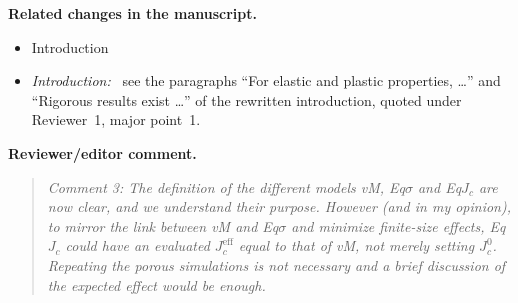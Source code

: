 \documentclass[pdflatex,sn-mathphys-num]{sn-jnl}
\newenvironment{reviewercomment}
  {\par\noindent\textbf{Reviewer/editor comment.}\begin{quote}\itshape}
  {\end{quote}}
\newenvironment{relatedchanges}
  {\par\noindent\textbf{Related changes in the manuscript.}\begin{itemize}\small}
  {\end{itemize}}
\newcommand{\msloc}[1]{\textit{#1:}\ }
\newcommand{\relhead}[1]{\item[]\vspace*{0.2\baselineskip}#1}
\begin{document}
\begin{relatedchanges}
\relhead{Introduction}
\item \msloc{Introduction} see the paragraphs ``For elastic and plastic properties, \dots'' and ``Rigorous results exist \dots'' of the rewritten introduction, quoted under Reviewer~1, major point~1.
\end{relatedchanges}

\begin{reviewercomment}
Comment 3: The definition of the different models vM, Eq$\sigma$ and Eq$J_c$ are now clear, and we understand their
purpose. However (and in my opinion), to mirror the link between vM and Eq$\sigma$ and minimize finite-size effects,
Eq$J_c$ could have an evaluated $J_c^{\mathrm{eff}}$ equal to that of vM, not merely setting $J_c^0$. Repeating the
porous simulations is not necessary and a brief discussion of the expected effect would be enough.
\end{reviewercomment}
\end{document}
